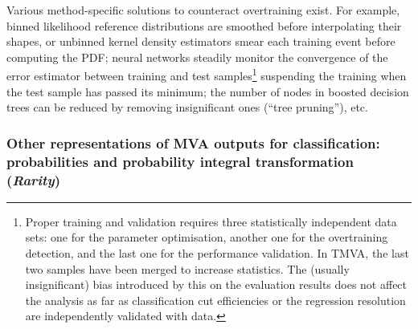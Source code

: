 Various method-specific solutions to counteract overtraining
exist. For example, binned likelihood reference distributions are
smoothed before interpolating their shapes, or unbinned kernel density
estimators smear each training event before computing the PDF; neural
networks steadily monitor the convergence of the error estimator
between training and test samples\footnote {
   \label{ftn:training}
   Proper training and validation requires three statistically
   independent data sets: one for the parameter optimisation, another
   one for the overtraining detection, and the last one for the
   performance validation. In TMVA, the last two samples have been
   merged to increase statistics. The (usually insignificant) bias
   introduced by this on the evaluation results does not affect the
   analysis as far as classification cut efficiencies or the
   regression resolution are independently validated with data.  }
suspending the training when the test sample has passed its minimum;
the number of nodes in boosted decision trees can be reduced by
removing insignificant ones (``tree pruning''), etc.

\subsubsection{Other representations of MVA outputs for classification: probabilities and probability integral transformation ({\em Rarity})}
\label{sec:otherRepresentations}

